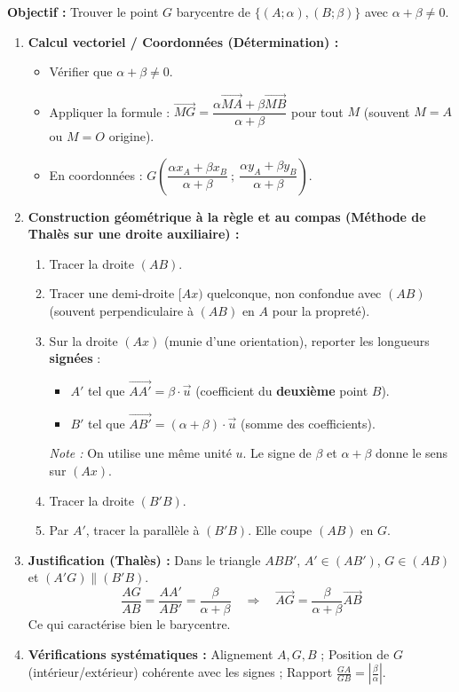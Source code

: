\documentclass[11pt]{article}
\begin{document}
\begin{methode}
\textbf{Objectif :} Trouver le point $G$ barycentre de $\{(A;\alpha), (B;\beta)\}$ avec $\alpha+\beta \neq 0$.
\begin{enumerate}
    \item \textbf{Calcul vectoriel / Coordonnées (Détermination) :}
    \begin{itemize}
        \item Vérifier que $\alpha+\beta \neq 0$.
        \item Appliquer la formule : $\overrightarrow{MG} = \dfrac{\alpha \overrightarrow{MA} + \beta \overrightarrow{MB}}{\alpha+\beta}$ pour tout $M$ (souvent $M=A$ ou $M=O$ origine).
        \item En coordonnées : $G\left(\dfrac{\alpha x_A + \beta x_B}{\alpha+\beta}\ ;\ \dfrac{\alpha y_A + \beta y_B}{\alpha+\beta}\right)$.
    \end{itemize}
    \item \textbf{Construction géométrique à la règle et au compas (Méthode de Thalès sur une droite auxiliaire) :}
    \begin{enumerate}
        \item Tracer la droite $(AB)$.
        \item Tracer une demi-droite $[Ax)$ quelconque, non confondue avec $(AB)$ (souvent perpendiculaire à $(AB)$ en $A$ pour la propreté).
        \item Sur la droite $(Ax)$ (munie d'une orientation), reporter les longueurs \textbf{signées} :
        \begin{itemize}
            \item $A'$ tel que $\overrightarrow{AA'} = \beta \cdot \vec{u}$ (coefficient du \textbf{deuxième} point $B$).
            \item $B'$ tel que $\overrightarrow{AB'} = (\alpha+\beta) \cdot \vec{u}$ (somme des coefficients).
        \end{itemize}
        \emph{Note :} On utilise une même unité $u$. Le signe de $\beta$ et $\alpha+\beta$ donne le sens sur $(Ax)$.
        \item Tracer la droite $(B'B)$.
        \item Par $A'$, tracer la parallèle à $(B'B)$. Elle coupe $(AB)$ en $G$.
    \end{enumerate}
    \item \textbf{Justification (Thalès) :} Dans le triangle $ABB'$, $A' \in (AB')$, $G \in (AB)$ et $(A'G) \parallel (B'B)$.
    \[
    \frac{AG}{AB} = \frac{AA'}{AB'} = \frac{\beta}{\alpha+\beta} \quad \Rightarrow \quad \overrightarrow{AG} = \frac{\beta}{\alpha+\beta}\overrightarrow{AB}
    \]
    Ce qui caractérise bien le barycentre.
    \item \textbf{Vérifications systématiques :} Alignement $A,G,B$ ; Position de $G$ (intérieur/extérieur) cohérente avec les signes ; Rapport $\frac{GA}{GB} = \left|\frac{\beta}{\alpha}\right|$.
\end{enumerate}
\end{methode}
\end{document}
